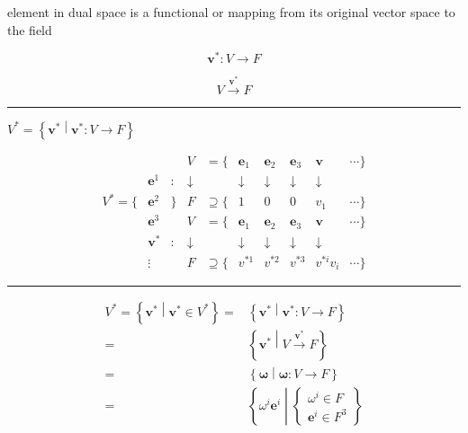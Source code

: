 \documentclass[
]{book}
\theoremstyle{definition}
\theoremstyle{definition}
\theoremstyle{definition}
\theoremstyle{definition}
\theoremstyle{remark}
\begin{document}
element in dual space is a functional or mapping from its original vector space to the field

\[
\boldsymbol{v}^{*}:V\rightarrow F
\]

\[
V\overset{\boldsymbol{v}^{*}}{\rightarrow}F
\]

\begin{center}\rule{0.5\linewidth}{0.5pt}\end{center}

\(V^{*}=\left\{ \boldsymbol{v}^{*}\middle|\boldsymbol{v}^{*}:V\rightarrow F\right\}\)

\[
\begin{array}{cccccccccc}
 &  &  & V & =\{ & \boldsymbol{e}_{{\scriptscriptstyle 1}} & \boldsymbol{e}_{{\scriptscriptstyle 2}} & \boldsymbol{e}_{{\scriptscriptstyle 3}} & \boldsymbol{v} & \cdots\}\\
 & \boldsymbol{e}^{{\scriptscriptstyle 1}} & : & \downarrow &  & \downarrow & \downarrow & \downarrow & \downarrow\\
V^{*}=\{ & \boldsymbol{e}^{{\scriptscriptstyle 2}} & \} & F & \supseteq\{ & 1 & 0 & 0 & v_{{\scriptscriptstyle 1}} & \cdots\}\\
 & \boldsymbol{e}^{{\scriptscriptstyle 3}} &  & V & =\{ & \boldsymbol{e}_{{\scriptscriptstyle 1}} & \boldsymbol{e}_{{\scriptscriptstyle 2}} & \boldsymbol{e}_{{\scriptscriptstyle 3}} & \boldsymbol{v} & \cdots\}\\
 & \boldsymbol{v}^{*} & : & \downarrow &  & \downarrow & \downarrow & \downarrow & \downarrow\\
 & \vdots &  & F & \supseteq\{ & v^{*{\scriptscriptstyle 1}} & v^{*{\scriptscriptstyle 2}} & v^{*{\scriptscriptstyle 3}} & v^{*{\scriptscriptstyle i}}v_{{\scriptscriptstyle i}} & \cdots\}
\end{array}
\]

\begin{center}\rule{0.5\linewidth}{0.5pt}\end{center}

\[
\begin{aligned}
V^{*}=\left\{ \boldsymbol{v}^{*}\middle|\boldsymbol{v}^{*}\in V^{*}\right\} =&\left\{ \boldsymbol{v}^{*}\middle|\boldsymbol{v}^{*}:V\rightarrow F\right\} \\=&\left\{ \boldsymbol{v}^{*}\middle|V\overset{\boldsymbol{v}^{*}}{\rightarrow}F\right\} \\=&\left\{ \boldsymbol{\omega}\middle|\boldsymbol{\omega}:V\rightarrow F\right\} \\=&\left\{ \omega^{{\scriptscriptstyle i}}\boldsymbol{e}^{{\scriptscriptstyle i}}\middle|\begin{cases}
\omega^{{\scriptscriptstyle i}}\in F\\
\boldsymbol{e}^{{\scriptscriptstyle i}}\in F^{3}
\end{cases}\right\} 
\end{aligned}
\]
\end{document}
